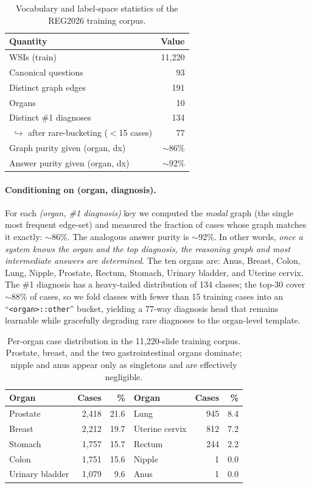 \documentclass[11pt,a4paper]{article}
\newcommand{\code}[1]{\texttt{\small #1}}
\begin{document}
\begin{table}[h]
\centering
\caption{Vocabulary and label-space statistics of the REG2026 training corpus.}
\label{tab:vocab}
\begin{tabular}{lr}
\toprule
Quantity & Value \\
\midrule
WSIs (train) & 11{,}220 \\
Canonical questions & 93 \\
Distinct graph edges & 191 \\
Organs & 10 \\
Distinct \#1 diagnoses & 134 \\
\,\,$\hookrightarrow$ after rare-bucketing ($<$15 cases) & 77 \\
Graph purity given (organ, dx) & $\sim$86\% \\
Answer purity given (organ, dx) & $\sim$92\% \\
\bottomrule
\end{tabular}
\end{table}

\paragraph{Conditioning on (organ, diagnosis).}
For each \emph{(organ, \#1 diagnosis)} key we computed the \emph{modal} graph (the single most
frequent edge-set) and measured the fraction of cases whose graph matches it exactly: $\sim$86\%.
The analogous answer purity is $\sim$92\%. In other words, \emph{once a system knows the organ
and the top diagnosis, the reasoning graph and most intermediate answers are determined}. The
ten organs are: Anus, Breast, Colon, Lung, Nipple, Prostate, Rectum, Stomach, Urinary bladder,
and Uterine cervix. The \#1 diagnosis has a heavy-tailed distribution of 134 classes; the
top-30 cover $\sim$88\% of cases, so we fold classes with fewer than 15 training cases into an
``\code{<organ>::other}'' bucket, yielding a 77-way diagnosis head that remains learnable while
gracefully degrading rare diagnoses to the organ-level template.

\begin{table}[h]
\centering
\caption{Per-organ case distribution in the 11{,}220-slide training corpus. Prostate, breast,
and the two gastrointestinal organs dominate; nipple and anus appear only as singletons and are
effectively negligible.}
\label{tab:organ}
\begin{tabular}{lrr@{\hspace{2.5em}}lrr}
\toprule
Organ & Cases & \% & Organ & Cases & \% \\
\midrule
Prostate        & 2{,}418 & 21.6 & Lung           & 945 & 8.4 \\
Breast          & 2{,}212 & 19.7 & Uterine cervix & 812 & 7.2 \\
Stomach         & 1{,}757 & 15.7 & Rectum         & 244 & 2.2 \\
Colon           & 1{,}751 & 15.6 & Nipple         & 1   & 0.0 \\
Urinary bladder & 1{,}079 &  9.6 & Anus           & 1   & 0.0 \\
\bottomrule
\end{tabular}
\end{table}
\end{document}
